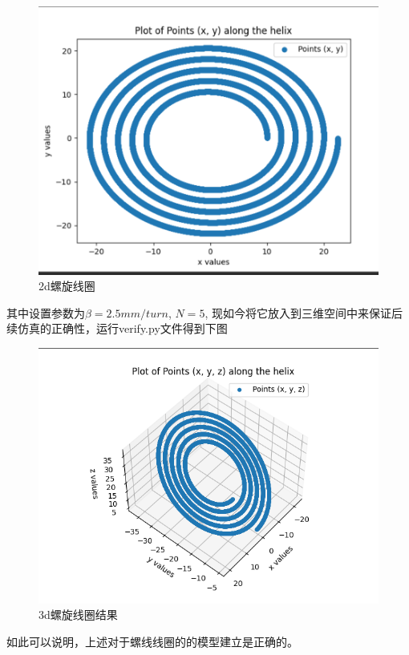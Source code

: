 \documentclass{article}
\begin{document}
\begin{figure}[h]
  \centering
  \includegraphics[scale=0.2]{veri1.png}
  \caption{2d螺旋线圈}
  \label{fig:example}
\end{figure}
其中设置参数为$\beta= 2.5mm/turn$, $N=5$, 现如今将它放入到三维空间中来保证后续仿真的正确性，运行verify.py文件得到下图

\begin{figure}[h]
  \centering
  \includegraphics[scale=0.35]{veri2.png}
  \caption{3d螺旋线圈结果}
  \label{fig:example}
\end{figure}

如此可以说明，上述对于螺线线圈的的模型建立是正确的。
\end{document}
